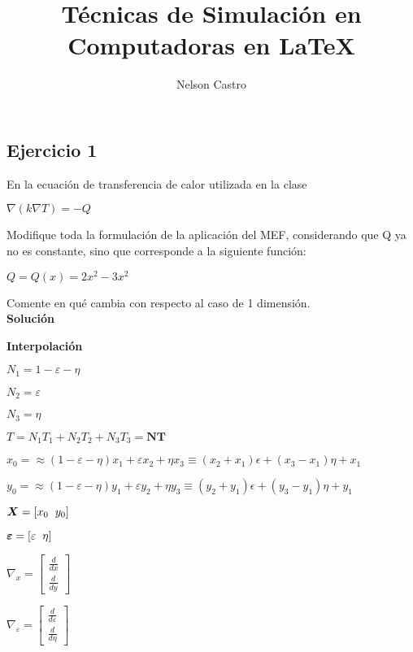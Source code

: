 \documentclass[12pt]{report}
\title{Técnicas de Simulación en Computadoras en \LaTeX}
\author{Nelson Castro}
\begin{document}
    \maketitle
    \newpage
    \subsection*{\bfseries \large Ejercicio 1}

    En la ecuación de transferencia de calor utilizada en la clase

    \begin{center}
        $\displaystyle \nabla \left( k \nabla T \right) = -Q$
    \end{center}
    Modifique toda la formulación de la aplicación del MEF, considerando que Q ya no es constante, sino que corresponde a la siguiente función:
    
    \begin{center}
        $\displaystyle Q = Q(x) = 2x^2 -3x^2$
    \end{center}
    Comente en qué cambia con respecto al caso de 1 dimensión.
    \\ \textbf{Solución}

    \centering \textbf{Interpolación}

    \begin{center}
        $\displaystyle N_1=1-\varepsilon - \eta$

        $\displaystyle N_2= \varepsilon$

        $\displaystyle N_3= \eta$

        $\displaystyle T = N_1 T_1 + N_2 T_2 + N_3 T_3 = \bm{NT}$

        $\displaystyle x_0= \approx (1-\varepsilon - \eta)x_1 + \varepsilon x_2 + \eta x_3 \equiv (x_2 + x_1)\epsilon + (x_3 - x_1)\eta + x_1$

        $\displaystyle y_0= \approx (1-\varepsilon - \eta)y_1 + \varepsilon y_2 + \eta y_3 \equiv (y_2 + y_1)\epsilon + (y_3 - y_1)\eta + y_1$

        $\displaystyle \bm X = [x_0 \hspace{0.2cm} y_0]$

        $\displaystyle \bm \varepsilon = [\varepsilon \hspace{0.2cm} \eta]$

        $\displaystyle \nabla_x = \left[ \begin{array}{c} \frac{d}{dx} \\ \frac{d}{dy} \end{array} \right]$

        $\displaystyle \nabla_\varepsilon = \left[ \begin{array}{c} \frac{d}{d\varepsilon} \\ \frac{d}{d\eta} \end{array} \right]$
    \end{center}
\end{document}
